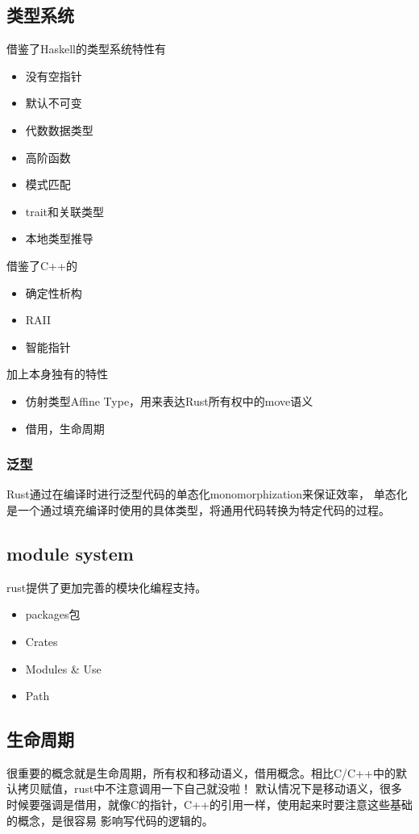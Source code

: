 \subsection{类型系统}
借鉴了Haskell的类型系统特性有
\begin{itemize}
    \item {没有空指针}
    \item {默认不可变}
    \item {代数数据类型}
    \item {高阶函数}
    \item {模式匹配}
    \item {trait和关联类型}
    \item {本地类型推导}
\end{itemize}
借鉴了C++的
\begin{itemize}
    \item {确定性析构}
    \item {RAII}
    \item {智能指针}
\end{itemize}
加上本身独有的特性
\begin{itemize}
    \item {仿射类型Affine Type，用来表达Rust所有权中的move语义}
    \item {借用，生命周期}
\end{itemize}

\subsubsection{泛型}
Rust通过在编译时进行泛型代码的单态化monomorphization来保证效率，
单态化是一个通过填充编译时使用的具体类型，将通用代码转换为特定代码的过程。


\subsection{module system}
rust提供了更加完善的模块化编程支持。
\begin{itemize}
    \item {packages包}
    \item {Crates}
    \item {Modules \& Use}
    \item {Path}
\end{itemize}



\subsection{生命周期}
很重要的概念就是生命周期，所有权和移动语义，借用概念。相比C/C++中的默认拷贝赋值，rust中不注意调用一下自己就没啦！
默认情况下是移动语义，很多时候要强调是借用，就像C的指针，C++的引用一样，使用起来时要注意这些基础的概念，是很容易
影响写代码的逻辑的。


